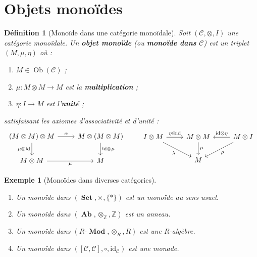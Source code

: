 \documentclass[a4paper,12pt]{book}
\DeclareMathOperator{\Ob}{Ob}
\DeclareMathOperator{\Set}{\mathbf{Set}}
\DeclareMathOperator{\Ab}{\mathbf{Ab}}
\DeclareMathOperator{\Mod}{\mathbf{Mod}}
\newcommand{\id}{\mathrm{id}}
\newcommand{\Z}{\mathbb{Z}}
\newtheorem{definition}[theoreme]{Définition}
\newtheorem{exemple}[theoreme]{Exemple}
\begin{document}
\section{Objets monoïdes}\label{sec:objets-monoides}

\begin{definition}[Monoïde dans une catégorie monoïdale]
\label{def:objet-monoide}
Soit $(\mathcal{C}, \otimes, I)$ une catégorie monoïdale.
Un \textbf{objet monoïde} (ou \textbf{monoïde dans $\mathcal{C}$})
est un triplet $(M, \mu, \eta)$ où :
\begin{enumerate}[label=(\roman*)]
\item $M \in \Ob(\mathcal{C})$ ;
\item $\mu \colon M \otimes M \to M$ est la \textbf{multiplication} ;
\item $\eta \colon I \to M$ est l'\textbf{unité} ;
\end{enumerate}
satisfaisant les axiomes d'associativité et d'unité :
\[
\begin{tikzcd}
(M \otimes M) \otimes M
  \arrow[r, "\alpha"]
  \arrow[d, "\mu \otimes \id"'] &
M \otimes (M \otimes M)
  \arrow[d, "\id \otimes \mu"] \\
M \otimes M \arrow[r, "\mu"'] &
M
\end{tikzcd}
\qquad
\begin{tikzcd}
I \otimes M
  \arrow[r, "\eta \otimes \id"]
  \arrow[dr, "\lambda"'] &
M \otimes M
  \arrow[d, "\mu"] &
M \otimes I
  \arrow[l, "\id \otimes \eta"']
  \arrow[dl, "\rho"] \\
& M &
\end{tikzcd}
\]
\end{definition}

\begin{exemple}[Monoïdes dans diverses catégories]\label{ex:objets-monoides}
\begin{enumerate}[label=(\roman*)]
\item Un monoïde dans $(\Set, \times, \{*\})$ est un monoïde
      au sens usuel.
\item Un monoïde dans $(\Ab, \otimes_\Z, \Z)$ est un anneau.
\item Un monoïde dans $(R\text{-}\Mod, \otimes_R, R)$ est une
      $R$-algèbre.
\item Un monoïde dans
      $([\mathcal{C}, \mathcal{C}], \circ, \id_\mathcal{C})$
      est une monade.
\end{enumerate}
\end{exemple}
\end{document}

